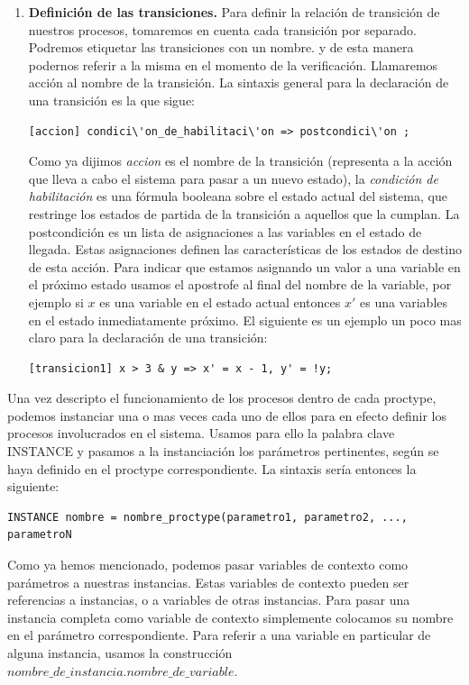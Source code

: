 \documentclass[titlepage, 12pt]{book}
\begin{document}
\begin{enumerate}
\item \textbf{Definici\'on de las transiciones.}
Para definir la relaci\'on de transici\'on de nuestros procesos, tomaremos en cuenta cada transici\'on por separado. Podremos etiquetar las transiciones con un nombre. y de esta manera podernos referir a la misma en el momento de la verificaci\'on. Llamaremos acci\'on al nombre de la transici\'on. La sintaxis general para la declaraci\'on de una transici\'on es la que sigue: \begin{verbatim}[accion] condici\'on_de_habilitaci\'on => postcondici\'on ;\end{verbatim}
Como ya dijimos \textit{accion} es el nombre de la transici\'on (representa a la acci\'on que lleva a cabo el sistema para pasar a un nuevo estado), la \textit{condici\'on de habilitaci\'on} es una f\'ormula booleana sobre el estado actual del sistema, que restringe los estados de partida de la transici\'on a aquellos que la cumplan. La postcondici\'on es un lista de asignaciones a las variables en el estado de llegada. Estas asignaciones definen las caracter\'isticas de los estados de destino de esta acci\'on. Para indicar que estamos asignando un valor a una variable en el pr\'oximo estado usamos el apostrofe al final del nombre de la variable, por ejemplo si $x$ es una variable en el estado actual entonces $x'$ es una variables en el estado inmediatamente pr\'oximo. El siguiente es un ejemplo un poco mas claro para la declaraci\'on de una transici\'on:\begin{verbatim}[transicion1] x > 3 & y => x' = x - 1, y' = !y;\end{verbatim}
\end{enumerate}

Una vez descripto el funcionamiento de los procesos dentro de cada proctype, podemos instanciar una o mas veces cada uno de ellos para en efecto definir los procesos involucrados en el sistema. Usamos para ello la palabra clave INSTANCE y pasamos a la instanciación los parámetros pertinentes, según se haya definido en el proctype correspondiente. La sintaxis sería entonces la siguiente: \begin{verbatim}INSTANCE nombre = nombre_proctype(parametro1, parametro2, ..., parametroN\end{verbatim}
Como ya hemos mencionado, podemos pasar variables de contexto como parámetros a nuestras instancias. Estas variables de contexto pueden ser referencias a instancias, o a variables de otras instancias. Para pasar una instancia completa como variable de contexto simplemente colocamos su nombre en el parámetro correspondiente. Para referir a una variable en particular de alguna instancia, usamos la construcción $nombre\_de\_instancia.nombre\_de\_variable$.\\
\end{document}
